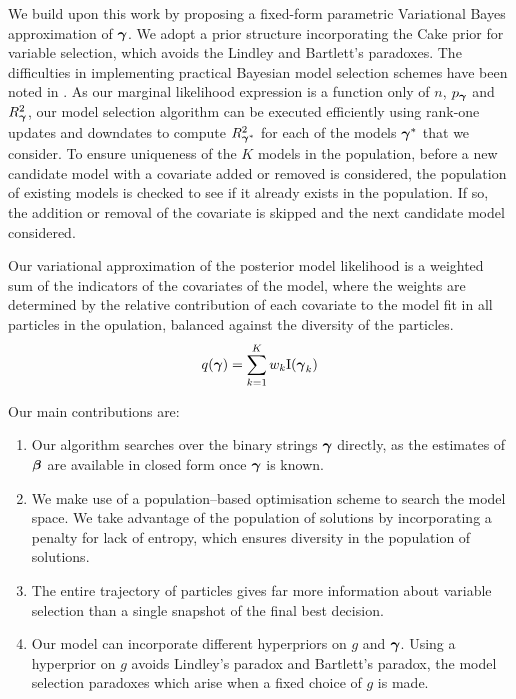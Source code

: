 We build upon this work by proposing a fixed-form parametric Variational Bayes
approximation of ${\boldsymbol \gamma}$. We adopt a prior structure incorporating the Cake
prior for variable selection, which avoids the Lindley and Bartlett's
paradoxes. The difficulties in implementing practical Bayesian model selection
schemes have been noted in \cite{Chipman2014}. As our marginal likelihood
expression is a function only of $n$, $p_{\boldsymbol \gamma}$ and $R^2_{\boldsymbol \gamma}$, our model
selection algorithm can be executed efficiently using rank-one updates and
downdates to compute $R^2_{{\boldsymbol \gamma}^*}$ for each of the models ${\boldsymbol \gamma}^*$ that
we consider. To ensure uniqueness of the $K$ models in the population, before a
new candidate model with a covariate added or removed is considered, the
population of existing models is checked to see if it already exists in the
population. If so, the addition or removal of the covariate is skipped and the
next candidate model considered.

Our variational approximation of the posterior model likelihood is a weighted
sum of the indicators of the covariates of the model, where the weights are
determined by the relative contribution of each covariate to the model fit in
all particles in the opulation, balanced against the diversity of the
particles.
\[
	q({\boldsymbol \gamma}) = \sum_{k=1}^K w_k \text{I}({\boldsymbol \gamma}_k)
\]


Our main contributions are:

\begin{enumerate}
    \item Our algorithm searches over the binary strings ${\boldsymbol \gamma}$ directly, as
        the estimates of ${\boldsymbol \beta}$ are available in closed form once ${\boldsymbol \gamma}$
        is known.

    \item We make use of a population--based optimisation scheme to search the
        model space. We take advantage of the population of solutions by
        incorporating a penalty for lack of entropy, which ensures diversity in
        the population of solutions.

    \item The entire trajectory of particles gives far more information about
        variable selection than a single snapshot of the final best decision.

    \item Our model can incorporate different hyperpriors on $g$ and ${\boldsymbol \gamma}$.
Using a hyperprior on $g$ avoids Lindley's paradox and Bartlett's paradox, the
model selection paradoxes which arise when a fixed choice of $g$ is made.
\end{enumerate}


